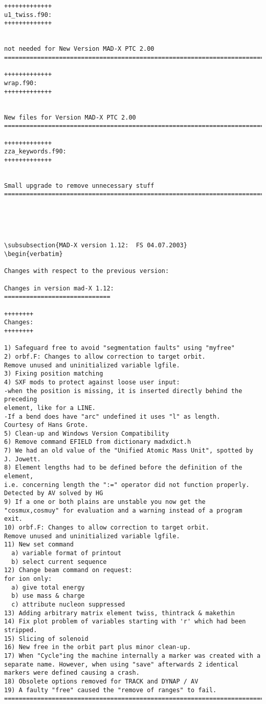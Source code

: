 \begin{verbatim}
+++++++++++++
u1_twiss.f90: 
+++++++++++++


not needed for New Version MAD-X PTC 2.00
=============================================================================

+++++++++++++
wrap.f90: 
+++++++++++++


New files for Version MAD-X PTC 2.00
=============================================================================

+++++++++++++
zza_keywords.f90: 
+++++++++++++


Small upgrade to remove unnecessary stuff
=============================================================================





\subsubsection{MAD-X version 1.12:  FS 04.07.2003}
\begin{verbatim}

Changes with respect to the previous version:

Changes in version mad-X 1.12:
=============================

++++++++
Changes:
++++++++

1) Safeguard free to avoid "segmentation faults" using "myfree"
2) orbf.F: Changes to allow correction to target orbit.
Remove unused and uninitialized variable lgfile.
3) Fixing position matching
4) SXF mods to protect against loose user input:
-when the position is missing, it is inserted directly behind the preceding
element, like for a LINE.
-If a bend does have "arc" undefined it uses "l" as length.
Courtesy of Hans Grote.
5) Clean-up and Windows Version Compatibility
6) Remove command EFIELD from dictionary madxdict.h
7) We had an old value of the "Unified Atomic Mass Unit", spotted by J. Jowett.
8) Element lengths had to be defined before the definition of the element,
i.e. concerning length the ":=" operator did not function properly.
Detected by AV solved by HG
9) If a one or both plains are unstable you now get the
"cosmux,cosmuy" for evaluation and a warning instead of a program
exit.
10) orbf.F: Changes to allow correction to target orbit.
Remove unused and uninitialized variable lgfile.
11) New set command
  a) variable format of printout
  b) select current sequence 
12) Change beam command on request:
for ion only:
  a) give total energy
  b) use mass & charge
  c) attribute nucleon suppressed 
13) Adding arbitrary matrix element twiss, thintrack & makethin 
14) Fix plot problem of variables starting with 'r' which had been
stripped.
15) Slicing of solenoid
16) New free in the orbit part plus minor clean-up.
17) When "Cycle"ing the machine internally a marker was created with a 
separate name. However, when using "save" afterwards 2 identical
markers were defined causing a crash.
18) Obsolete options removed for TRACK and DYNAP / AV
19) A faulty "free" caused the "remove of ranges" to fail.
=============================================================================






\end{verbatim}
